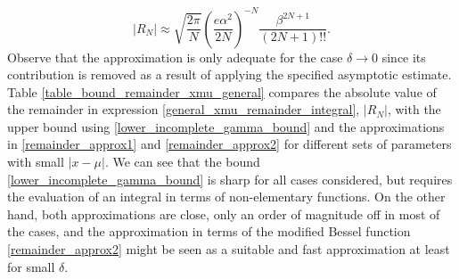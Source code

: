 \documentclass[10pt,a4paper,oneside]{article}
\numberwithin{equation}{section}
\begin{document}
\begin{equation}
|R_N| \approx \sqrt{\frac{2\pi}{N}} \left(\frac{e\alpha^2}{2N}\right)^{-N} \frac{\beta^{2N + 1}}{(2N + 1)!!}.
\end{equation}
Observe that the approximation is only adequate for the case $\delta \to 0$ since its contribution is removed as a result of applying the specified asymptotic estimate. Table \ref{table_bound_remainder_xmu_general} compares the absolute value of the remainder in expression \eqref{general_xmu_remainder_integral}, $|R_N|$, with the upper bound using \eqref{lower_incomplete_gamma_bound} and the approximations in \eqref{remainder_approx1} and \eqref{remainder_approx2} for different sets of parameters with small $|x-\mu|$. We can see that the bound \eqref{lower_incomplete_gamma_bound} is sharp for all cases considered, but requires the evaluation of an integral in terms of non-elementary functions. On the other hand, both approximations are close, only an order of magnitude off in most of the cases, and the approximation in terms of the modified Bessel function \eqref{remainder_approx2} might be seen as a suitable and fast approximation at least for small $\delta$.

\begin{table}[H]
	\centering
	\caption{Comparison of various approximations (\eqref{remainder_approx1} and \eqref{remainder_approx2}) and the upper bound \eqref{lower_incomplete_gamma_bound} for the estimation of the remainder \eqref{general_xmu_remainder_integral}.}
	\label{table_bound_remainder_xmu_general}
\end{table}
\end{document}
